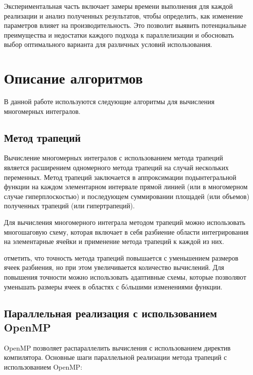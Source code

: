 \documentclass[]{article}
\theoremstyle{remark}
\theoremstyle{definition}
\begin{document}
\par Экспериментальная часть включает замеры времени выполнения для каждой реализации и анализ полученных результатов, чтобы определить, как изменение параметров влияет на производительность. Это позволит выявить потенциальные преимущества и недостатки каждого подхода к параллелизации и обосновать выбор оптимального варианта для различных условий использования.

\newpage

\section{Описание алгоритмов}

\par В данной работе используются следующие алгоритмы для вычисления  многомерных интегралов.

\subsection{Метод трапеций}

\par Вычисление многомерных интегралов с использованием метода трапеций является расширением одномерного метода трапеций на случай нескольких переменных. Метод трапеций заключается в аппроксимации подынтегральной функции на каждом элементарном интервале прямой линией (или в многомерном случае гиперплоскостью) и последующем суммировании площадей (или объемов) полученных трапеций (или гипертрапеций).

\par Для вычисления многомерного интеграла методом трапеций можно использовать многошаговую схему, которая включает в себя разбиение области интегрирования на элементарные ячейки и применение метода трапеций к каждой из них.

 отметить, что точность метода трапеций повышается с уменьшением размеров ячеек разбиения, но при этом увеличивается количество вычислений. Для повышения точности можно использовать адаптивные схемы, которые позволяют уменьшать размеры ячеек в областях с бóльшими изменениями функции.

\subsection{Параллельная реализация с использованием OpenMP}

\par OpenMP позволяет распараллелить вычисления с использованием директив компилятора. Основные шаги параллельной реализации метода трапеций с использованием OpenMP:
\end{document}
